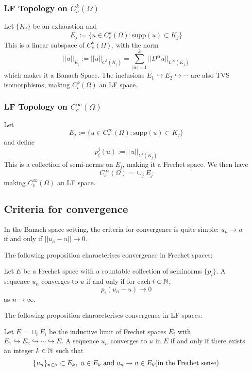 \subsubsection{LF Topology on $C^k_c(\Omega)$}
Let $\{K_i\}$ be an exhaustion and $$E_j:=\{u\in C^k_c(\Omega): \mathrm{supp}(u)\subset K_j \}$$
This is a linear subspace of $C^k_c(\Omega)$, with the norm $$||u||_{E_j}:=||u||_{C^k(K_j)}=\sum_{|\alpha|=1}^k ||D^{\alpha}u||_{L^{\infty}(K_j)} $$ which makes it a Banach Space. The inclusions $E_1 \hookrightarrow E_2 \hookrightarrow \cdots$ are also TVS isomorphisms, making $C^k_c(\Omega)$ an LF space.
\subsubsection{LF Topology on $C^{\infty}_c(\Omega)$}
Let $$E_j:=\{u\in C^{\infty}_c(\Omega):\mathrm{supp}(u)\subset K_j\}$$ and define $$p^j_i(u):=||u||_{C^i(K_j)}$$
This is a collection of semi-norms on $E_j$, making it a Frechet space. 
We then have $$C^{\infty}_c(\Omega)=\cup_j E_j$$ making $C_c^{\infty}(\Omega)$ an LF space. 

\subsection{Criteria for convergence}
In the Banach space setting, the criteria for convergence is quite simple: $u_n\to u$ if and only if $||u_n-u||\to 0$. 

The following proposition characterises convergence in Frechet spaces:
\begin{proposition}
Let $E$ be a Frechet space with a countable collection of seminorms $\{p_i\}$. A sequence $u_n$ converges to $u$ if and only if for each $i\in \mathbb{N}$, $$p_i(u_n-u)\to 0$$ as $n\to\infty$.    
\end{proposition}

The following proposition characeterises convergence in LF spaces:

\begin{proposition}\label{defn:convergence_in_LF}{Let $E=\cup_i E_i$ be the inductive limit of Frechet spaces $E_i$ with $E_1\hookrightarrow E_2 \hookrightarrow \cdots \hookrightarrow E$. A sequence $u_n$ converges to $u$ in $E$ if and only if there exists an integer $k\in \mathbb{N}$ such that $$\{u_n\}_{n\in \mathbb{N}}\subset E_k, \ u\in E_k \ \text{and} \ u_n\to u \in E_k (\text{in the Frechet sense})$$}\end{proposition}


